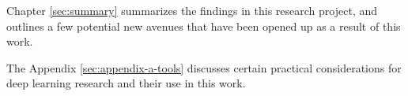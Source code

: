 Chapter \ref{sec:summary} summarizes the findings in this research project, and outlines a few potential new avenues that have been opened up as a result of this work.

The Appendix \ref{sec:appendix-a-tools} discusses certain practical considerations for deep learning research and their use in this work.

